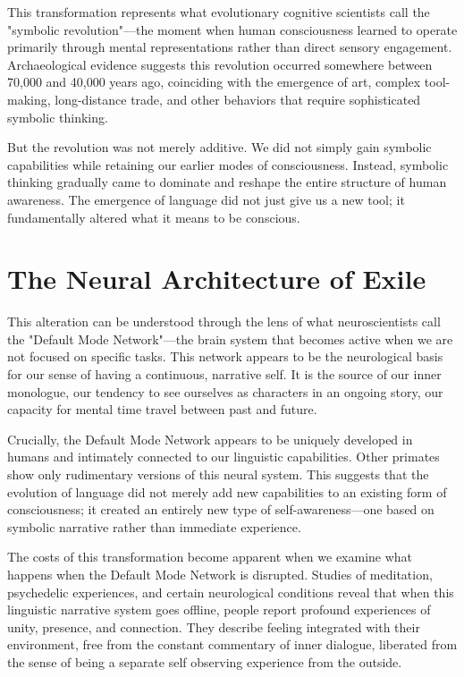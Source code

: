 This transformation represents what evolutionary cognitive scientists call the "symbolic revolution"—the moment when human consciousness learned to operate primarily through mental representations rather than direct sensory engagement. Archaeological evidence suggests this revolution occurred somewhere between 70,000 and 40,000 years ago, coinciding with the emergence of art, complex tool-making, long-distance trade, and other behaviors that require sophisticated symbolic thinking.

But the revolution was not merely additive. We did not simply gain symbolic capabilities while retaining our earlier modes of consciousness. Instead, symbolic thinking gradually came to dominate and reshape the entire structure of human awareness. The emergence of language did not just give us a new tool; it fundamentally altered what it means to be conscious.

\section{The Neural Architecture of Exile}

This alteration can be understood through the lens of what neuroscientists call the "Default Mode Network"—the brain system that becomes active when we are not focused on specific tasks. This network appears to be the neurological basis for our sense of having a continuous, narrative self. It is the source of our inner monologue, our tendency to see ourselves as characters in an ongoing story, our capacity for mental time travel between past and future.

Crucially, the Default Mode Network appears to be uniquely developed in humans and intimately connected to our linguistic capabilities. Other primates show only rudimentary versions of this neural system. This suggests that the evolution of language did not merely add new capabilities to an existing form of consciousness; it created an entirely new type of self-awareness—one based on symbolic narrative rather than immediate experience.

The costs of this transformation become apparent when we examine what happens when the Default Mode Network is disrupted. Studies of meditation, psychedelic experiences, and certain neurological conditions reveal that when this linguistic narrative system goes offline, people report profound experiences of unity, presence, and connection. They describe feeling integrated with their environment, free from the constant commentary of inner dialogue, liberated from the sense of being a separate self observing experience from the outside.

